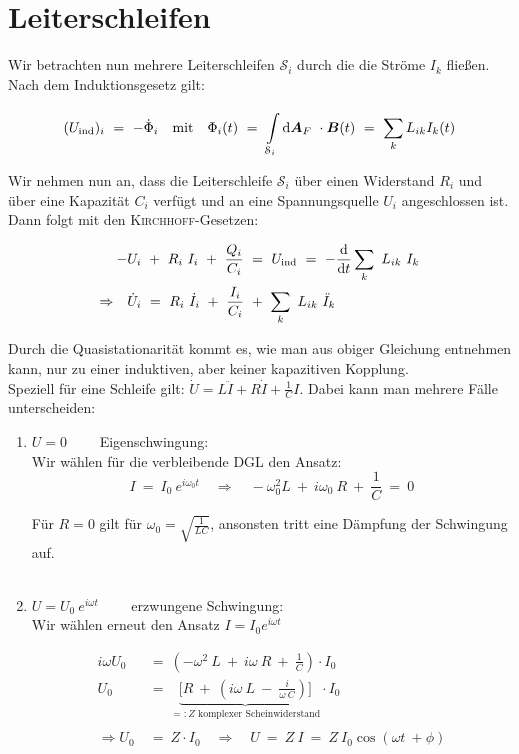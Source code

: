 \section{Leiterschleifen}

Wir betrachten nun mehrere Leiterschleifen $\mathcal{S}_i$ durch die  die Ströme $I_k$ fließen. Nach dem Induktionsgesetz gilt:

\begin{equation*}
(U_{\text{ind}})_i  \ = \ -\dot{\Phi}_i \quad \text{mit} \quad \Phi_i (t)  \ = \ \Int{\mathcal{S}_i}{}{\vec{A}_F}\cdot\vec{B}(t)  \ = \ \sum_k L_{ik} I_k(t)
\end{equation*}

Wir nehmen nun an, dass die Leiterschleife $\mathcal{S}_i$ über einen Widerstand $R_i$ und über eine Kapazität $C_i$ verfügt und an eine Spannungsquelle $U_i$ angeschlossen ist. Dann folgt mit den \textsc{Kirchhoff}-Gesetzen:

\begin{align*}
- & U_i \ + \ R_i \ I_i \ + \ \frac{Q_i}{C_i} \ = \ U_{\text{ind}}  \ = \ -\diff{}{t} \sum_k \ L_{ik} \ I_k\\
\Rightarrow \quad & \dot{U}_i  \ = \ R_i \ \dot{I}_i \ + \ \frac{I_i}{C_i} \ + \ \sum_k \ L_{ik} \ \ddot{I}_k
\end{align*}

Durch die Quasistationarität kommt es, wie man aus obiger Gleichung entnehmen kann, nur zu einer induktiven, aber keiner kapazitiven Kopplung.\\
Speziell für eine Schleife gilt: $\dot{U}=L\ddot{I}+R\dot{I}+\frac{1}{C}I$. Dabei kann man mehrere Fälle unterscheiden:
\ \\
\begin{enumerate}[label=\roman*]
\item $U=0\qquad$ Eigenschwingung:
\ \\
Wir wählen für die verbleibende DGL den Ansatz:
\begin{equation*}
I \ = \ I_0 \ e^{i\omega_0 t} \quad\Rightarrow\quad -\omega_0^2 L \ + \ i\omega_0 \ R \ + \ \frac{1}{C} \ = \ 0
\end{equation*}

Für $R=0$ gilt für $\omega_0=\sqrt{\frac{1}{LC}}$, ansonsten tritt eine Dämpfung der Schwingung auf.
\ \\\

\item $U=U_0 \ e^{i\omega t} \qquad$ erzwungene Schwingung:	
\ \\
Wir wählen erneut den Ansatz $I=I_0 e^{i\omega t}$

\begin{align*}
i\omega U_0  \ &= \ \left(-\omega^2 \ L \ + \ i \omega \ R \ + \ \frac{1}{C}\right) \cdot I_0\\
U_0 \ &= \ \underbrace{\Bigg[R \ + \ \left(i\omega \ L \ - \ \frac{i}{\omega \ C}\right)\Bigg]}_{=: Z \text{ komplexer Scheinwiderstand}} \cdot I_0\\
\ \\
\Rightarrow U_0 \ &= \ Z \cdot I_0 \quad\Rightarrow\quad U  \ = \ Z \ I  \ = \  Z \ I_0 \cos (\omega t \ + \phi)
\end{align*}
\end{enumerate}

